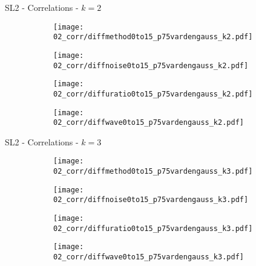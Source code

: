 \documentclass{beamer}
\begin{document}
\begin{frame}{SL2 - Correlations - $k=2$}{}
\begin{figure}
\centering
\begin{subfigure}{0.19\textwidth}
\texttt{[image: 02\_corr/diffmethod0to15\_p75vardengauss\_k2.pdf]}
\end{subfigure}
\begin{subfigure}{0.19\textwidth}
\texttt{[image: 02\_corr/diffnoise0to15\_p75vardengauss\_k2.pdf]}
\end{subfigure}
\begin{subfigure}{0.19\textwidth}
\end{subfigure}
\begin{subfigure}{0.19\textwidth}
\texttt{[image: 02\_corr/diffuratio0to15\_p75vardengauss\_k2.pdf]}
\end{subfigure}
\begin{subfigure}{0.19\textwidth}
\texttt{[image: 02\_corr/diffwave0to15\_p75vardengauss\_k2.pdf]}
\end{subfigure}
\end{figure}
\end{frame}

\begin{frame}{SL2 - Correlations - $k=3$}{}
\begin{figure}
\centering
\begin{subfigure}{0.19\textwidth}
\texttt{[image: 02\_corr/diffmethod0to15\_p75vardengauss\_k3.pdf]}
\end{subfigure}
\begin{subfigure}{0.19\textwidth}
\texttt{[image: 02\_corr/diffnoise0to15\_p75vardengauss\_k3.pdf]}
\end{subfigure}
\begin{subfigure}{0.19\textwidth}
\end{subfigure}
\begin{subfigure}{0.19\textwidth}
\texttt{[image: 02\_corr/diffuratio0to15\_p75vardengauss\_k3.pdf]}
\end{subfigure}
\begin{subfigure}{0.19\textwidth}
\texttt{[image: 02\_corr/diffwave0to15\_p75vardengauss\_k3.pdf]}
\end{subfigure}
\end{figure}
\end{frame}
\end{document}
